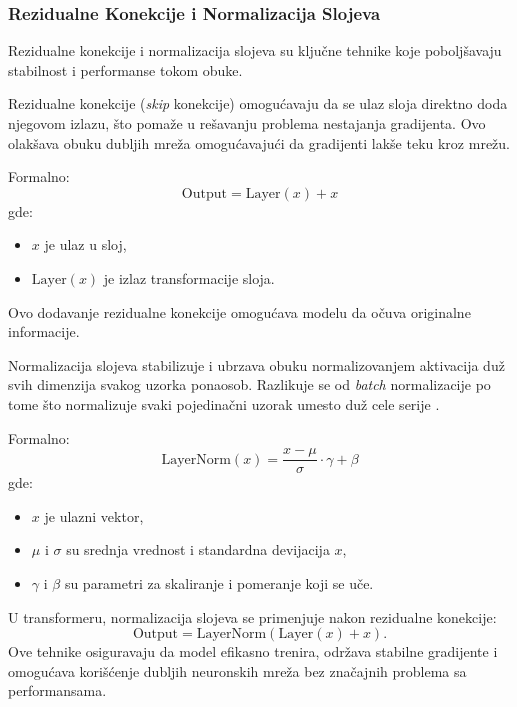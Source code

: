 \documentclass[12pt]{article}
\begin{document}
   \subsubsection*{Rezidualne Konekcije i Normalizacija Slojeva}

   Rezidualne konekcije i normalizacija slojeva su ključne tehnike koje poboljšavaju 
   stabilnost i performanse tokom obuke.

   Rezidualne konekcije (\textit{skip} konekcije) omogućavaju da se ulaz sloja direktno 
   doda njegovom izlazu, što pomaže u rešavanju problema nestajanja gradijenta. Ovo 
   olakšava obuku dubljih mreža omogućavajući da gradijenti lakše teku kroz mrežu.

   Formalno:
   \[
   \text{Output} = \text{Layer}(x) + x
   \]
   gde:
   \begin{itemize}
      \vspace{-0.5cm}
      \item \( x \) je ulaz u sloj,
      \item \( \text{Layer}(x) \) je izlaz transformacije sloja.
   \end{itemize}

   Ovo dodavanje rezidualne konekcije omogućava modelu da očuva originalne informacije.
   
   Normalizacija slojeva stabilizuje i ubrzava obuku normalizovanjem aktivacija duž 
   svih dimenzija svakog uzorka ponaosob. Razlikuje se od \textit{batch} normalizacije po 
   tome što normalizuje svaki pojedinačni uzorak umesto duž cele serije \cite{batch_vs_layer}.

   Formalno:
   \[
   \text{LayerNorm}(x) = \frac{x - \mu}{\sigma} \cdot \gamma + \beta
   \]
   gde:
   \begin{itemize}
      \vspace{-0.5cm}
      \setlength\itemsep{0.2em} %
      \item \( x \) je ulazni vektor,
      \item \( \mu \) i \( \sigma \) su srednja vrednost i standardna devijacija \( x \),
      \item \( \gamma \) i \( \beta \) su parametri za skaliranje i pomeranje koji se uče.
   \end{itemize}

   U transformeru, normalizacija slojeva se primenjuje nakon rezidualne konekcije:
   \[
   \text{Output} = \text{LayerNorm}(\text{Layer}(x) + x).
   \]  
   Ove tehnike osiguravaju da model efikasno trenira, održava stabilne gradijente i 
   omogućava korišćenje dubljih neuronskih mreža bez značajnih problema sa performansama.
\end{document}
